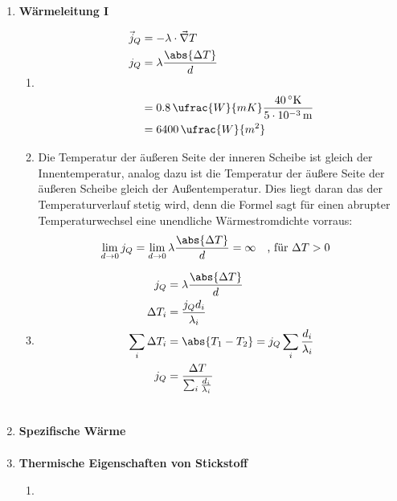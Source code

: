 \documentclass[11pt,letterpaper]{article}
\begin{document}

\begin{enumerate}
  \item \textbf{Wärmeleitung I}
    \begin{enumerate}
      \item
        \begin{align*}
          \vec{j}_Q &= -\lambda\cdot \vec{\nabla}T\\
          j_Q&= \lambda \frac{\abs{\Delta T}}{d}\\
          \\
          &= 0.8\,\ufrac{W}{mK} \frac{40\,^\circ\mathrm{K}}{5\cdot 10^{-3}\, \mathrm{m}}\\
          &= 6400\,\ufrac{W}{m^2}
        \end{align*}

      \item
        Die Temperatur der äußeren Seite der inneren Scheibe ist gleich der Innentemperatur,
        analog dazu ist die Temperatur der äußere Seite der äußeren Scheibe gleich der Außentemperatur.
        Dies liegt daran das der Temperaturverlauf stetig wird, denn die Formel sagt für einen 
        abrupter Temperaturwechsel eine unendliche Wärmestromdichte vorraus:
        \begin{align*}
          \lim_{d\to 0}j_Q &= \lim_{d\to 0}\lambda \frac{\abs{\Delta T}}{d} = \infty \quad \text{, für } \Delta T >0
        \end{align*}

      \item
        \begin{align*}
          j_Q&= \lambda \frac{\abs{\Delta T}}{d}\\
          \Delta T_{i} &= \frac{j_Q d_i}{\lambda_i}\\
          \sum_{i} \Delta T_{i} &= \abs{T_1 - T_2} = j_Q \sum_i \frac{ d_i}{\lambda_i}\\
          j_Q &= \frac{\Delta T}{ \sum_i \frac{ d_i}{\lambda_i}}\\
          \\
        \end{align*}
    \end{enumerate}

  \item \textbf{Spezifische Wärme}
    \begin{align*}
    \end{align*}


  \item \textbf{Thermische Eigenschaften von Stickstoff}
    \begin{enumerate}
      \item
        \begin{align*}
        \end{align*}


\end{enumerate}
\end{enumerate}
\end{document}

